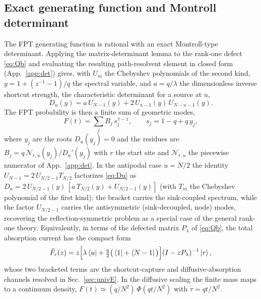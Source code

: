 \documentclass[reprint,amsmath,amssymb,aps,prresearch,longbibliography]{revtex4-2}
\begin{document}
\subsection{Exact generating function and Montroll determinant}\label{sec:modelB}
The FPT generating function is rational with an exact Montroll-type determinant. Applying the
matrix-determinant lemma to the rank-one defect \eqref{eq:Qb} and evaluating the resulting
path-resolvent element in closed form (App.~\ref{app:det}) gives, with $U_m$ the Chebyshev
polynomials of the second kind, $y=1+(z^{-1}-1)/q$ the spectral variable, and $a=q/\lambda$ the
dimensionless inverse shortcut strength, the characteristic determinant for a source at $u$,
\begin{equation}
D_u(y)=a\,U_{N-1}(y)+2\,U_{u-1}(y)\,U_{N-u-1}(y).
\label{eq:Du}
\end{equation}
The FPT probability is then a finite sum of geometric modes,
\begin{equation}
F(t)=\sum_j B_j\, s_j^{\,t-1},\qquad s_j=1-q+q\,y_j,
\label{eq:Ft}
\end{equation}
where $y_j$ are the roots $D_u(y_j)=0$ and the residues are $B_j=q\,\mathcal N_{r,u}(y_j)/D_u'(y_j)$
with $r$ the start site and $\mathcal N_{r,u}$ the piecewise numerator of App.~\ref{app:det}. In the
antipodal case $u=N/2$ the identity $U_{N-1}=2\,U_{N/2-1}T_{N/2}$ factorizes \eqref{eq:Du} as
$D_u=2\,U_{N/2-1}(y)\,[a\,T_{N/2}(y)+U_{N/2-1}(y)]$ (with $T_m$ the Chebyshev polynomial of the first
kind): the bracket carries the sink-coupled spectrum, while the factor $U_{N/2-1}$ carries the
antisymmetric (sink-decoupled, node) modes, recovering the reflection-symmetric problem as a special
case of the general rank-one theory. Equivalently, in terms of the defected matrix $P_\lambda$ of
\eqref{eq:Qb}, the total absorption current has the compact form
\begin{equation}
\tilde F_r(z)=z\Big[\lambda\bra{u}+\tfrac q2\big(\bra{1}+\bra{N-1}\big)\Big](I-zP_\lambda)^{-1}\ket{r},
\label{eq:genfun}
\end{equation}
whose two bracketed terms are the shortcut-capture and diffusive-absorption channels resolved in
Sec.~\ref{sec:univE}. In the diffusive scaling the finite mass maps to a continuum density,
$F(t)\simeq(q/N^2)\,\Phi(qt/N^2)$ with $\tau=qt/N^2$.
\end{document}
